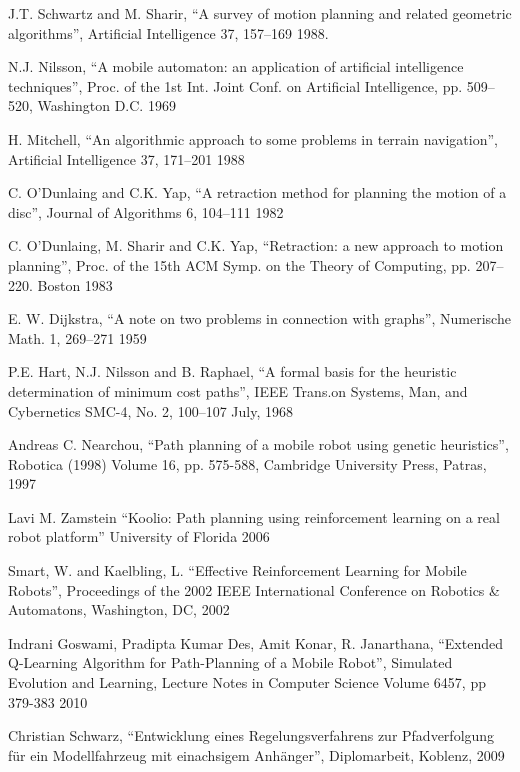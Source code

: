 \documentclass[m,bachelor,binding,oneside,palatino]{thesisdifctunl}
\begin{document}
\begin{thebibliography}{9}

  J.T. Schwartz and M. Sharir,
  "`A survey of motion planning and related geometric algorithms"',
  Artificial Intelligence 37, 157–169
  1988.
	
	N.J. Nilsson,
	“A mobile automaton: an application of artificial intelligence techniques”,
	Proc. of the 1st Int. Joint Conf. on Artificial Intelligence, pp. 509–520,
	Washington D.C.
	1969

	H. Mitchell, 
	“An algorithmic approach to some problems in terrain navigation”,
	Artificial Intelligence 37, 171–201
	1988

	C. O’Dunlaing and C.K. Yap,
	“A retraction method for planning the motion of a disc”,
	Journal of Algorithms 6, 104–111 
	1982

	C. O’Dunlaing, M. Sharir and C.K. Yap,
	“Retraction: a new approach to motion planning”,
	Proc. of the 15th ACM Symp. on the Theory of Computing, pp. 207–220.
	Boston
	1983
	
	E. W. Dijkstra,
	“A note on two problems in connection with graphs”,
	Numerische Math. 1, 269–271 
	1959
	
	P.E. Hart, N.J. Nilsson and B. Raphael,
	“A formal basis for the heuristic determination of minimum cost paths”,
	IEEE Trans.on Systems, Man, and Cybernetics SMC-4, No. 2, 100–107
	July, 1968
	
	Andreas C. Nearchou,
	"`Path planning of a mobile robot using genetic heuristics"',
	Robotica (1998) Volume 16, pp. 575-588,
	Cambridge University Press,
	Patras,
	1997	
	
	Lavi M. Zamstein
	"`Koolio: Path planning using reinforcement learning on a real robot platform"'
	University of Florida
	2006
	
	Smart, W. and Kaelbling, L.
	"`Effective Reinforcement Learning for Mobile Robots"',
	Proceedings of the 2002 IEEE International Conference on Robotics & Automatons,
	Washington, DC,
	2002
	
	Indrani Goswami, Pradipta Kumar Des, Amit Konar, R. Janarthana,
	"`Extended Q-Learning Algorithm for Path-Planning of a Mobile Robot"',
	Simulated Evolution and Learning, Lecture Notes in Computer Science Volume 6457, pp 379-383
	2010

	Christian Schwarz,
	"`Entwicklung eines Regelungsverfahrens zur Pfadverfolgung für ein Modellfahrzeug mit einachsigem Anhänger"',
	Diplomarbeit,
	Koblenz,
	2009
	

\end{thebibliography}
\end{document}
